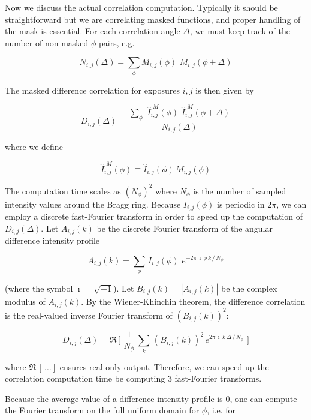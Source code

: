 \documentclass [12pt,fleqn]{article}
\def \be {\begin{equation}}
\def \ee {\end{equation}}
\begin{document}
Now we discuss the actual correlation computation. Typically it should be straightforward but we are correlating masked functions, and proper handling of the mask is essential. For each correlation angle $\Delta$, we must keep track of the number of non-masked $\phi$ pairs, e.g. 

\begin{equation}
N_{i,j}(\Delta) = \sum\limits_{\phi} M_{i,j}(\phi)\,\,M_{i,j}(\phi + \Delta)
\end{equation}

The masked difference correlation for exposures $i,j$ is then given by 

\begin{equation}
D_{i,j}(\Delta) = 
\frac
{\sum\limits_{\phi}
\,\,\widehat I^{\,\,M}_{i,j}(\phi)
\,\,\widehat I^{\,\,M}_{i,j}(\phi+\Delta) }
{N_{i,j}(\Delta)}
\end{equation}

where we define

\begin{equation}
\widehat I^{\,\,M}_{i,j}(\phi) \equiv \widehat I_{i,j}(\phi) \,M_{i,j}(\phi)
\end{equation}

The computation time scales as $(N_\phi)^2$ where $N_\phi$ is the number of sampled intensity values around the Bragg ring. Because $I_{i,j}(\phi)$ is periodic in $2\pi$, we can employ a discrete fast-Fourier transform in order to speed up the computation of $D_{i,j}(\Delta)$. Let $A_{i,j}(k)$ be the discrete Fourier transform of the angular difference intensity profile

\be
A_{i,j}(k) = \sum_\phi \,I_{i,j}(\phi)  \,\,e^  {-2\pi \,\imath \,\phi\, k \,/\, N_\phi }
\ee 

(where the symbol $\imath = \sqrt{-1}$). Let $B_{i,j}(k) = |A_{i,j}(k) |$ be the complex modulus of $A_{i,j}(k)$. By the Wiener-Khinchin theorem, the difference correlation is the real-valued inverse Fourier transform of $\left( B_{i,j}(k) \right) ^2$:

\be
D_{i,j}(\Delta) = \mathfrak R\, \big[ \,\, \frac{1}{N_\phi}\,\sum_k \,\left(B_{i,j}(k)\right)^2  \,e^  {2\pi \,\imath \,k\,\Delta \,/\, N_\phi }\,\, \big]
\ee 

where $\mathfrak R \,[ \,\dots ]$ ensures real-only output. Therefore, we can speed up the correlation computation time be computing 3 fast-Fourier transforms. 

Because the average value of a difference intensity profile is $0$, one can compute the Fourier transform on the full uniform domain for $\phi$, i.e. for 
\end{document}
